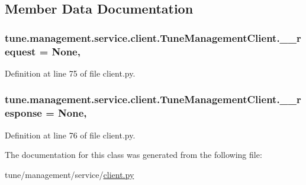 \subsection{Member Data Documentation}
\hypertarget{classtune_1_1management_1_1service_1_1client_1_1TuneManagementClient_a2e3f42c415bc8c9bdaf55f75acddbbd5}{
\subsubsection[{\-\_\-\-\_\-request}]{\setlength{\rightskip}{0pt plus 5cm}tune.\-management.\-service.\-client.\-Tune\-Management\-Client.\-\_\-\-\_\-request = None\hspace{0.3cm}{\ttfamily [static]}, {\ttfamily [private]}}}\label{classtune_1_1management_1_1service_1_1client_1_1TuneManagementClient_a2e3f42c415bc8c9bdaf55f75acddbbd5}


Definition at line 75 of file client.\-py.

\hypertarget{classtune_1_1management_1_1service_1_1client_1_1TuneManagementClient_a07773038d49e05c7e999a687f477e418}{
\subsubsection[{\-\_\-\-\_\-response}]{\setlength{\rightskip}{0pt plus 5cm}tune.\-management.\-service.\-client.\-Tune\-Management\-Client.\-\_\-\-\_\-response = None\hspace{0.3cm}{\ttfamily [static]}, {\ttfamily [private]}}}\label{classtune_1_1management_1_1service_1_1client_1_1TuneManagementClient_a07773038d49e05c7e999a687f477e418}


Definition at line 76 of file client.\-py.



The documentation for this class was generated from the following file\-:\begin{DoxyCompactItemize}
\item 
tune/management/service/\hyperlink{client_8py}{client.\-py}\end{DoxyCompactItemize}
